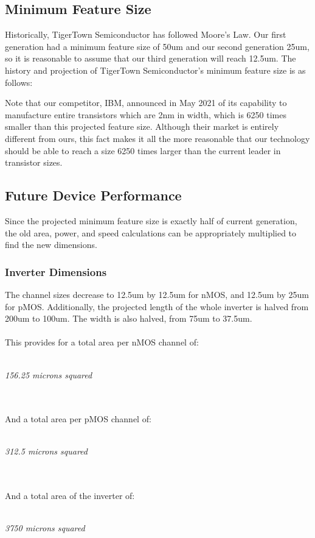 \documentclass[12pt]{article}
\begin{document}
\subsection{Minimum Feature Size}
Historically, TigerTown Semiconductor has followed Moore's Law. Our first generation had a minimum feature size of 50um and our second generation 25um, so it is reasonable to assume that our third generation will reach 12.5um. The history and projection of TigerTown Semiconductor's minimum feature size is as follows:
\begin{center}
\end{center}
Note that our competitor, IBM, announced in May 2021 of its capability to manufacture entire transistors which are 2nm in width, which is 6250 times smaller than this projected feature size. Although their market is entirely different from ours, this fact makes it all the more reasonable that our technology should be able to reach a size 6250 times larger than the current leader in transistor sizes.

\subsection{Future Device Performance}
Since the projected minimum feature size is exactly half of current generation, the old area, power, and speed calculations can be appropriately multiplied to find the new dimensions.
\subsubsection{Inverter Dimensions}
The channel sizes decrease to 12.5um by 12.5um for nMOS, and 12.5um by 25um for pMOS. Additionally, the projected length of the whole inverter is halved from 200um to 100um. The width is also halved, from 75um to 37.5um. 
\\
\\This provides for a total area per nMOS channel of:
\\
\\\centerline{\emph{156.25 microns squared}}
\\
\\And a total area per pMOS channel of:
\\
\\\centerline{\emph{312.5 microns squared}}
\\
\\And a total area of the inverter of:
\\
\\\centerline{\emph{3750 microns squared}}
\end{document}
